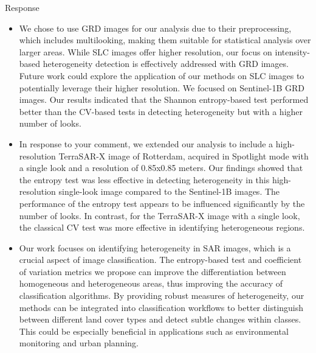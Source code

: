 \documentclass[11pt]{report}
\begin{document}
\begin{responsebox}{Response}
\begin{itemize}
 \item We chose to use GRD images for our analysis due to their preprocessing, which includes multilooking, making them suitable for statistical analysis over larger areas. While SLC images offer higher resolution, our focus on intensity-based heterogeneity detection is effectively addressed with GRD images. 
Future work could explore the application of our methods on SLC images to potentially leverage their higher resolution.
We focused on Sentinel-1B GRD images. Our results indicated that the Shannon entropy-based test performed better than the CV-based tests in detecting heterogeneity but with a higher number of looks.

\item In response to your comment, we extended our analysis to include a high-resolution TerraSAR-X image of Rotterdam, acquired in Spotlight mode with a single look and a resolution of 0.85x0.85 meters.
Our findings showed that the entropy test was less effective in detecting heterogeneity in this high-resolution single-look image compared to the Sentinel-1B images. 
The performance of the entropy test appears to be influenced significantly by the number of looks.
In contrast, for the TerraSAR-X image with a single look, the classical CV test was more effective in identifying heterogeneous regions.

\item Our work focuses on identifying heterogeneity in SAR images, which is a crucial aspect of image classification. 
The entropy-based test and coefficient of variation metrics we propose can improve the differentiation between homogeneous and heterogeneous areas, thus improving the accuracy of classification algorithms. 
By providing robust measures of heterogeneity, our methods can be integrated into classification workflows to better distinguish between different land cover types and detect subtle changes within classes. This could be especially beneficial in applications such as environmental monitoring and urban planning.
\end{itemize}




\end{responsebox}
\end{document}
